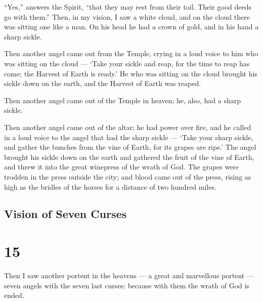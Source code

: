 ``Yes,'' answers the Spirit, ``that they may rest from their toil. Their
good deeds go with them.''  Then, in my vision, I saw a
white cloud, and on the cloud there was sitting one like a man. On his
head he had a crown of gold, and in his hand a sharp sickle.

 Then another angel came out from the Temple, crying in a
loud voice to him who was sitting on the cloud --- `Take your sickle and
reap, for the time to reap has come; the Harvest of Earth is ready.'
 He who was sitting on the cloud brought his sickle down on
the earth, and the Harvest of Earth was reaped.

 Then another angel came out of the Temple in heaven; he,
also, had a sharp sickle.

 Then another angel came out of the altar; he had power
over fire, and he called in a loud voice to the angel that had the sharp
sickle --- `Take your sharp sickle, and gather the bunches from the vine
of Earth, for its grapes are ripe.'  The angel brought his
sickle down on the earth and gathered the fruit of the vine of Earth,
and threw it into the great winepress of the wrath of God. 
The grapes were trodden in the press outside the city; and blood came
out of the press, rising as high as the bridles of the horses for a
distance of two hundred miles.

\hypertarget{vision-of-seven-curses}{%
\subsection{Vision of Seven Curses}\label{vision-of-seven-curses}}

\hypertarget{section-14}{%
\section{15}\label{section-14}}

 Then I saw another portent in the heavens --- a great and
marvellous portent --- seven angels with the seven last curses; because
with them the wrath of God is ended.

